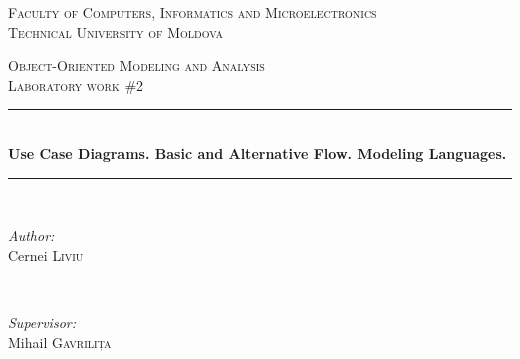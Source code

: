 \documentclass[12pt,a4paper,titlepage]{article}
\begin{document}
\begin{titlepage}

  \begin{center} %

  \textsc{\large Faculty of Computers, Informatics and Microelectronics}\\[0.5cm]
  \textsc{\large Technical University of Moldova}\\[1.2cm] %
  \vspace{25 mm}

  \textsc{\Large Object-Oriented Modeling and Analysis}\\[0.5cm] %
  \textsc{\large Laboratory work \#2}\\[0.5cm] %

\newcommand{\HRule}{\rule{\linewidth}{0.5mm}} %

  \vspace{10 mm}
  \HRule \\[0.4cm]
  { \LARGE \bfseries Use Case Diagrams. Basic and Alternative Flow. Modeling Languages. }\\[0.4cm] %
  \HRule \\[1.5cm]

      \vspace{30mm}

      \begin{minipage}{0.4\textwidth}
      \begin{flushleft} \large
      \emph{Author:}\\
      Cernei \textsc{Liviu}
      \end{flushleft}
      \end{minipage}
      ~
      \begin{minipage}{0.4\textwidth}
      \begin{flushright} \large
      \emph{Supervisor:} \\
      Mihail \textsc{Gavrilița} %
      \end{flushright}
      \end{minipage}\\[4cm]


\end{center}
\end{titlepage}
\end{document}
